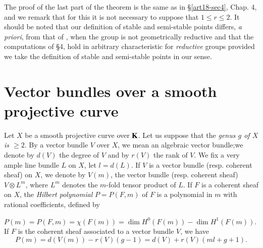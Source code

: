 The proof of the last part of the theorem is the same as in \S\ref{art18-sec4}, Chap. 4, \cite{art18-key5} and we remark that for this it is not necessary to suppose that $1\leq r\leq 2$. It should be noted that our definition of stable and semi-stable points differs, {\em a priori}, from that of \cite{art18-key4}, when the group is not geometrically reductive and that the computations of \S4, \cite{art18-key4} hold in arbitrary characteristic for {\em reductive} groups provided we take the definition of stable and semi-stable points in our sense.

\section{Vector bundles over a smooth projective curve}\label{art18-sec3}

Let $X$ be a smooth projective curve over $\mathbf{K}$. Let us suppose that the {\em genus $g$ of $X$ is $\geq 2$}. By a vector bundle $V$ over $X$, we mean an algebraic vector bundle;\pageoriginale we denote by $d(V)$ the degree of $V$ and by $r(V)$ the rank of $V$. We fix a very ample line bundle $L$ on $X$, let $l=d(L)$. If $V$ is a vector bundle (resp. coherent sheaf) on $X$, we denote by $V(m)$, the vector bundle (resp. coherent sheaf) $V\otimes L^{m}$, where $L^{m}$ denotes the $m$-fold tensor product of $L$. If $F$ is a coherent sheaf on $X$, the {\em Hilbert polynomial} $P=P(F,m)$ of $F$ is a polynomial in $m$ with rational coefficients, defined by

$P(m)=P(F,m)=\chi(F(m))=\dim H^{0}(F(m))-\dim H^{1}(F(m))$. If $F$ is the coherent sheaf associated to a vector bundle $V$, we have
$$
P(m)=d(V(m))-r(V)(g-1)=d(V)+r(V)(ml+g+1).
$$

